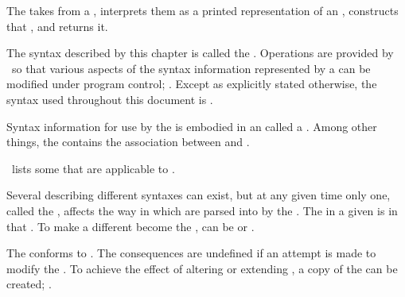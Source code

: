 

The  takes  from a , 
interprets them as a printed representation of an ,
constructs that , and returns it.

The syntax described by this chapter is called the .
Operations are provided by \clisp\ so that
various aspects of the syntax information represented by a  
can be modified under program control; \seechapter\Reader.
Except as explicitly stated otherwise, 
the syntax used throughout this document is .


Syntax information for use by the  is embodied in an
 called a .  Among other things, 
the  contains the association between  
and .

\Thenextfigure\ lists some  that are applicable to
.




Several  describing different syntaxes can exist,
but at any given time only one, called the , 
affects the way in which  are parsed 
into  by the .
The  in a given 
is  in that .
To make a different  become the ,
 can be  or .

\endsubsubsection%


The  conforms to .
The consequences are undefined if an attempt is made
to modify the .
To achieve the effect of altering or extending ,
a copy of the  can be created; .

